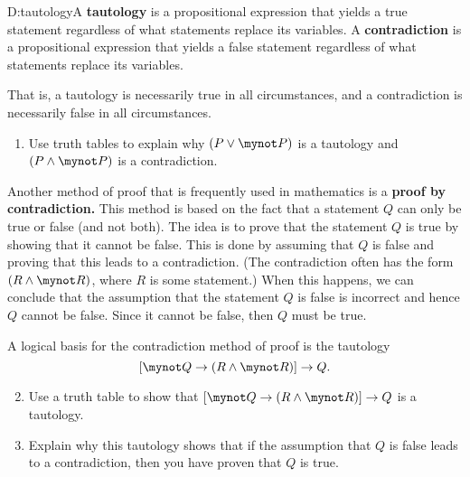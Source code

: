 \begin{previewactivity}\label{PA:contradicton} \hfill
{}%

\begin{defbox}{D:tautology}{A \textbf{tautology}
%
 is a propositional expression that yields a true statement regardless of what statements replace its variables. A \textbf{contradiction}
%
 is a propositional expression that yields a false statement regardless of what statements replace its variables.}
\end{defbox}

That is, a tautology is necessarily true in all circumstances, and a contradiction is necessarily false in all circumstances.

\begin{enumerate}
\item Use truth tables to explain why  $\left( {P \vee \mynot  P} \right)$ is a tautology and $\left( {P \wedge \mynot  P} \right)$ is a contradiction.
\end{enumerate}

Another method of proof that is frequently used in mathematics is a 
\textbf{proof by contradiction.}
%
  This method is based on the fact that a statement  $Q$  can only be true or false (and not both).  The idea is to prove that the statement $Q$  is true by showing that it cannot be false.  This is done by assuming that  $Q$  is false and proving that this leads to a contradiction.  (The contradiction often has the form  
$\left( {R \wedge \mynot  R} \right)$, where  $R$  is some statement.)  When this happens, we can conclude that the assumption that the statement  $Q$  is false is incorrect and hence $Q$  cannot be false.  Since it cannot be false, then $Q$  must be true.

A logical basis for the contradiction method of proof is the tautology
\[
\left[ {\mynot  Q \to \left( {R \wedge \mynot  R} \right)} \right] \to Q.
\]

\begin{enumerate}
\setcounter{enumi}{1}
  \item Use a truth table to show that 
$\left[ {\mynot  Q \to \left( {R \wedge \mynot  R} \right)} \right] \to Q$  is a tautology.

  \item Explain why this tautology shows that if the assumption that  $Q$  is false leads to a contradiction, then you have proven that  $Q$  is true.
\end{enumerate}
\end{previewactivity}
